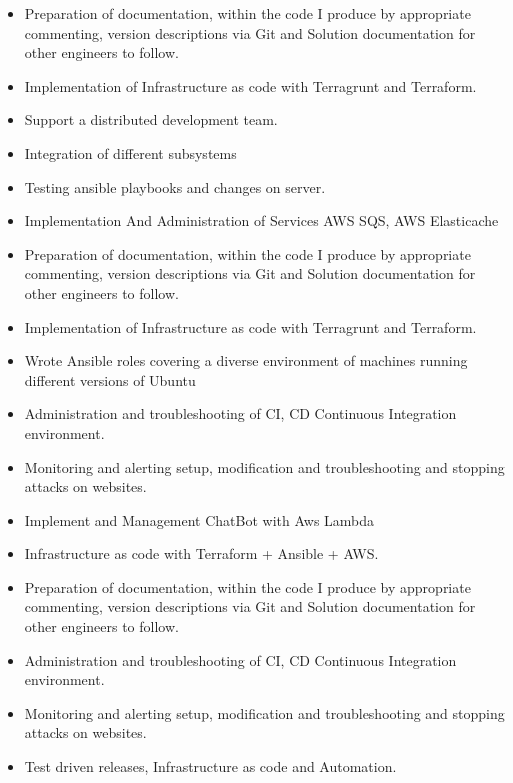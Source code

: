 \divider

\begin{itemize}
    \item Preparation of documentation, within the code I produce by appropriate commenting, version descriptions via Git and Solution documentation for other engineers to follow.
    \item Implementation of Infrastructure as code with Terragrunt and Terraform.
    \item Support a distributed development team.
    \item Integration of different subsystems
    \item Testing ansible playbooks and changes on server.
    \item Implementation And Administration of Services AWS SQS, AWS Elasticache
\end{itemize}

\divider

\begin{itemize}
    \item Preparation of documentation, within the code I produce by appropriate commenting, version descriptions via Git and Solution documentation for other engineers to follow.
    \item Implementation of Infrastructure as code with Terragrunt and Terraform.
    \item Wrote Ansible roles covering a diverse environment of machines running different versions of Ubuntu
    \item Administration and troubleshooting of CI, CD Continuous Integration environment.
    \item Monitoring and alerting setup, modification and troubleshooting and stopping attacks on websites.
    \item Implement and Management ChatBot with Aws Lambda
\end{itemize}

\divider

\begin{itemize}
    \item Infrastructure as code with Terraform + Ansible + AWS.
    \item Preparation of documentation, within the code I produce by appropriate commenting, version descriptions via Git and Solution documentation for other engineers to follow.
    \item Administration and troubleshooting of CI, CD Continuous Integration environment.
    \item Monitoring and alerting setup, modification and troubleshooting and stopping attacks on websites.
    \item Test driven releases, Infrastructure as code and Automation.
\end{itemize}

